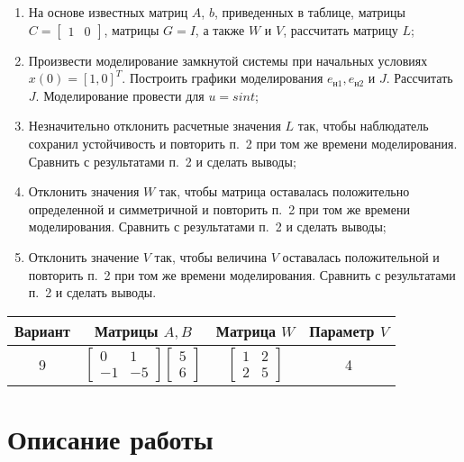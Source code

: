 \documentclass[14pt, a4paper]{extarticle}
\begin{document}
	\begin{enumerate}
		\item На основе известных матриц $A$, $b$, приведенных в таблице, матрицы $C = [
		\begin{matrix}
			1 & 0 
		\end{matrix}]$, матрицы $G=I$, а также $W$ и $V$, рассчитать матрицу $L$;
		\item Произвести моделирование замкнутой системы при начальных условиях $x(0)= [1,0]^T$. Построить графики моделирования $e_{\text{н}1}, e_{\text{н}2}$ и $J$. Рассчитать $J$. Моделирование провести для $u = sint$;
		\item Незначительно отклонить расчетные значения $L$ так, чтобы наблюдатель сохранил устойчивость и повторить п.~2 при том же времени моделирования. Сравнить с результатами п.~2 и сделать выводы;
		\item Отклонить значения $W$ так, чтобы матрица оставалась положительно определенной и симметричной и повторить п.~2 при том же времени моделирования. Сравнить с результатами п.~2 и сделать выводы;
		\item Отклонить значение $V$ так, чтобы величина $V$ оставалась положительной и повторить п.~2 при том же времени моделирования. Сравнить с результатами п.~2 и сделать выводы.
	\end{enumerate}
	\begin{table}[H]
		\centering
		\begin{tabular}{|c|c|c|c|}
			\hline
			Вариант & Матрицы $A,B$ & Матрица $W$ & Параметр $V$ \\\hline
			9 & 
			$\left[
			\begin{matrix}
				0 & 1 \\
				-1 & -5 
			\end{matrix}
			\right]
			\left[
			\begin{matrix}
				5 \\
				6
			\end{matrix}\right]$
			& 
			$\left[
			\begin{matrix}
				1 & 2 \\
				2 & 5
			\end{matrix}
			\right]$
			& 4 \\\hline
		\end{tabular}
	\end{table}
	
	\newpage
	
	\section*{Описание работы}
	
\end{document}
